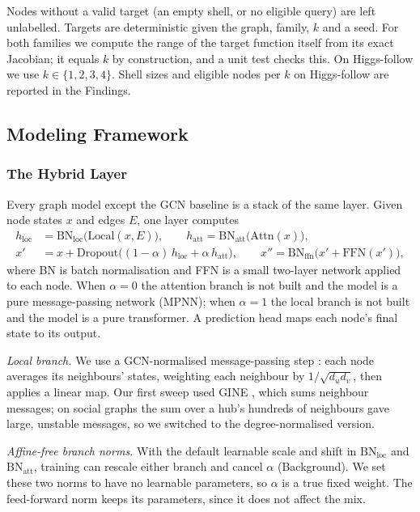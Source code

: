 Nodes without a valid target (an empty shell, or no eligible query) are left unlabelled. Targets are deterministic given the graph, family, $k$ and a seed. For both families we compute the range of the target function itself from its exact Jacobian; it equals $k$ by construction, and a unit test checks this. On Higgs-follow we use $k\in\{1,2,3,4\}$. Shell sizes and eligible nodes per $k$ on Higgs-follow are reported in the Findings.

\subsection{Modeling Framework}

\subsubsection{The Hybrid Layer}
Every graph model except the GCN baseline is a stack of the same layer. Given node states $x$ and edges $E$, one layer computes
\begin{align*}
h_{\text{loc}} &= \mathrm{BN}_{\text{loc}}\big(\mathrm{Local}(x,E)\big), \qquad
h_{\text{att}} = \mathrm{BN}_{\text{att}}\big(\mathrm{Attn}(x)\big),\\
x' &= x + \mathrm{Dropout}\big((1-\alpha)\,h_{\text{loc}} + \alpha\,h_{\text{att}}\big),\qquad
x'' = \mathrm{BN}_{\text{ffn}}\big(x' + \mathrm{FFN}(x')\big),
\end{align*}
where BN is batch normalisation \citep{f_ioffe2015} and FFN is a small two-layer network applied to each node. When $\alpha=0$ the attention branch is not built and the model is a pure message-passing network (MPNN); when $\alpha=1$ the local branch is not built and the model is a pure transformer. A prediction head maps each node's final state to its output.

\textit{Local branch.} We use a GCN-normalised message-passing step \citep{kipf2017}: each node averages its neighbours' states, weighting each neighbour by $1/\sqrt{d_u d_v}$, then applies a linear map. Our first sweep used GINE \citep{hu2020}, which sums neighbour messages; on social graphs the sum over a hub's hundreds of neighbours gave large, unstable messages, so we switched to the degree-normalised version.

\textit{Affine-free branch norms.} With the default learnable scale and shift in $\mathrm{BN}_{\text{loc}}$ and $\mathrm{BN}_{\text{att}}$, training can rescale either branch and cancel $\alpha$ (Background). We set these two norms to have no learnable parameters, so $\alpha$ is a true fixed weight. The feed-forward norm keeps its parameters, since it does not affect the mix.


